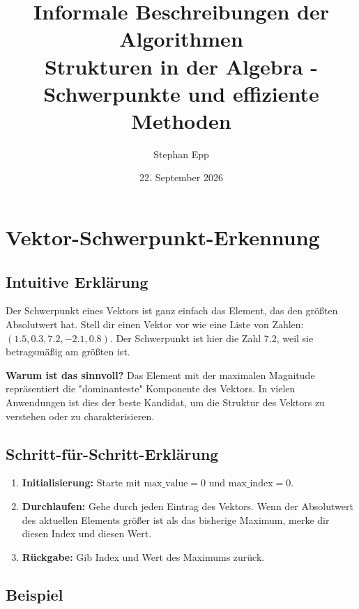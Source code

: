 \documentclass[a4paper,12pt]{article}
\title{\textbf{Informale Beschreibungen der Algorithmen}\\
Strukturen in der Algebra - Schwerpunkte und effiziente Methoden}
\author{Stephan Epp}
\date{22. September 2026}
\begin{document}
\maketitle

\tableofcontents
\newpage


\section{Vektor-Schwerpunkt-Erkennung}

\subsection{Intuitive Erklärung}

Der Schwerpunkt eines Vektors ist ganz einfach das Element, das den größten Absolutwert hat. Stell dir einen Vektor vor wie eine Liste von Zahlen: $(1.5, 0.3, 7.2, -2.1, 0.8)$. Der Schwerpunkt ist hier die Zahl $7.2$, weil sie betragsmäßig am größten ist.

\textbf{Warum ist das sinnvoll?} Das Element mit der maximalen Magnitude repräsentiert die "dominanteste" Komponente des Vektors. In vielen Anwendungen ist dies der beste Kandidat, um die Struktur des Vektors zu verstehen oder zu charakterisieren.

\subsection{Schritt-für-Schritt-Erklärung}

\begin{enumerate}
\item \textbf{Initialisierung:} Starte mit $\text{max\_value} = 0$ und $\text{max\_index} = 0$.

\item \textbf{Durchlaufen:} Gehe durch jeden Eintrag des Vektors. Wenn der Absolutwert des aktuellen Elements größer ist als das bisherige Maximum, merke dir diesen Index und diesen Wert.

\item \textbf{Rückgabe:} Gib Index und Wert des Maximums zurück.
\end{enumerate}

\subsection{Beispiel}
\end{document}
